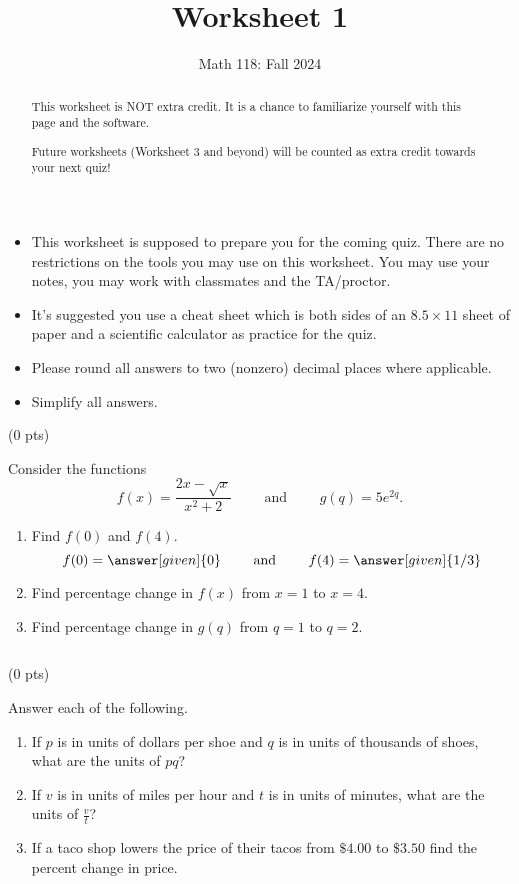 \documentclass{ximera}
\title{Worksheet 1}
\author{Math 118: Fall 2024}
\begin{document}
\begin{abstract}
This worksheet is NOT extra credit. It is a chance to familiarize yourself with this page and the software. 

Future worksheets (Worksheet 3 and beyond) will be counted as extra credit towards your next quiz!
\end{abstract}
\maketitle


\begin{itemize}
    \item This worksheet is supposed to prepare you for the coming quiz. There are no restrictions on the tools you may use on this worksheet. You may use your notes, you may work with classmates and the TA/proctor. 
    \item It's suggested you use a cheat sheet which is both sides of an $8.5\times 11$ sheet of paper and a scientific calculator as practice for the quiz.
    \item Please round all answers to two (nonzero) decimal places where applicable.
    \item Simplify all answers.
\end{itemize}


 (0 pts)

Consider the functions $$f(x)=\frac{2x-\sqrt{x}}{x^2+2}\qquad\text{ and }\qquad g(q)=5e^{2q}.$$

     \begin{enumerate}[label=(\alph*)]
        \item Find $f(0)$ and $f(4)$. $$f(0)=\answer[given]{0}\qquad\text{ and }\qquad f(4)=\answer[given]{1/3}$$ \vspace{5cm}
        \item Find percentage change in $f(x)$ from $x=1$ to $x=4$. \vspace{5cm}
        \item Find percentage change in $g(q)$ from $q=1$ to $q=2$. 
    \end{enumerate}
    




\newpage $\,$
\newpage


 (0 pts)

Answer each of the following.

\begin{enumerate}[label=(\alph*)]
    \item If $p$ is in units of dollars per shoe and $q$ is in units of thousands of shoes, what are the units of $pq$? \vspace{5cm}
    \item If $v$ is in units of miles per hour and $t$ is in units of minutes, what are the units of $\frac{v}{t}$? \vspace{5cm}
    \item If a taco shop lowers the price of their tacos from $\$4.00$ to $\$3.50$ find the percent change in price. 
\end{enumerate}
\end{document}
